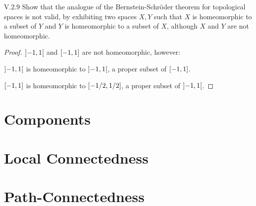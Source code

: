 \begin{problem}{V.2.9}
Show that the analogue of the Bernstein-Schr\"{o}der theorem for topological spaces is not valid, by exhibiting two spaces \( X, Y \) such that \( X \) is homeomorphic to a subset of \( Y \) and \( Y \) is homeomorphic to a subset of \( X \), although \( X \) and \( Y \) are not homeomorphic.
\end{problem}

\begin{proof}
	\( \left\rbrack{-1, 1}\right\lbrack \) and \( \left\lbrack{-1, 1}\right\rbrack \) are not homeomorphic, however:

	\( \left\rbrack{-1, 1}\right\lbrack \) is homeomorphic to \( \left\rbrack{-1, 1}\right\lbrack \), a proper subset of \( \left\lbrack{-1, 1}\right\rbrack \).

	\( \left\lbrack{-1, 1}\right\rbrack \) is homeomorphic to \( \left\lbrack{-1/2, 1/2}\right\rbrack \), a proper subset of \( \left\rbrack{-1, 1}\right\lbrack \).
\end{proof}

\section{Components}

\section{Local Connectedness}

\section{Path-Connectedness}

